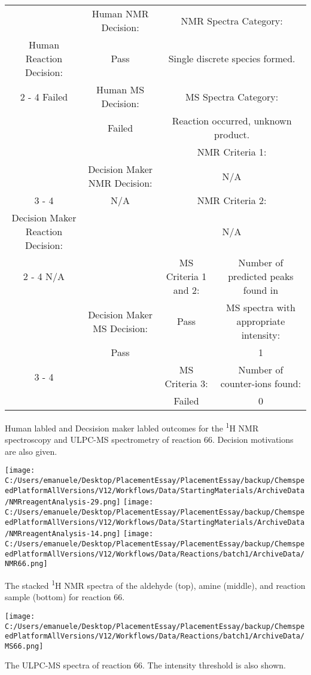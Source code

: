 \documentclass{article}%
\begin{document}
\begin{Decision Table}[H]%
\begin{tabular}{|c|c|c|c|}%
\hline%
&Human NMR Decision:&\multicolumn{2}{|c|}{NMR Spectra Category:}\\%
Human Reaction Decision:&Pass&\multicolumn{2}{|c|}{Single discrete species formed.}\\%
\cline{2%
-%
4}%
Failed&Human MS Decision:&\multicolumn{2}{|c|}{MS Spectra Category:}\\%
&Failed&\multicolumn{2}{|c|}{Reaction occurred, unknown product.}\\%
\hline%
&&\multicolumn{2}{|c|}{NMR Criteria 1:}\\%
&Decision Maker NMR Decision:&\multicolumn{2}{|c|}{N/A}\\%
\cline{3%
-%
4}%
&N/A&\multicolumn{2}{|c|}{NMR Criteria 2:}\\%
Decision Maker Reaction Decision:&&\multicolumn{2}{|c|}{N/A}\\%
\cline{2%
-%
4}%
N/A&&MS Criteria 1 and 2:&Number of predicted peaks found in\\%
&Decision Maker MS Decision:&Pass&MS spectra with appropriate intensity:\\%
&Pass&&1\\%
\cline{3%
-%
4}%
&&MS Criteria 3:&Number of counter{-}ions found:\\%
&&Failed&0\\%
\hline%
\end{tabular}%
\caption{Human labled and Decsision maker labled outcomes for the \textsuperscript{1}H NMR spectroscopy and ULPC-MS spectrometry of reaction 66. Decision motivations are also given.}%
\end{Decision Table}%
\begin{NMR Spectra}[H]%
\begin{center}%
\texttt{[image: C:/Users/emanuele/Desktop/PlacementEssay/PlacementEssay/backup/ChemspeedPlatformAllVersions/V12/Workflows/Data/StartingMaterials/ArchiveData/NMRreagentAnalysis-29.png]}\hfill%
\texttt{[image: C:/Users/emanuele/Desktop/PlacementEssay/PlacementEssay/backup/ChemspeedPlatformAllVersions/V12/Workflows/Data/StartingMaterials/ArchiveData/NMRreagentAnalysis-14.png]}\hfill%
\texttt{[image: C:/Users/emanuele/Desktop/PlacementEssay/PlacementEssay/backup/ChemspeedPlatformAllVersions/V12/Workflows/Data/Reactions/batch1/ArchiveData/NMR66.png]}\hfill%
\end{center}%
\caption{The stacked \textsuperscript{1}H NMR spectra of the aldehyde (top), amine (middle), and reaction sample (bottom) for reaction 66.}%
\end{NMR Spectra}%
\begin{MS Spectra}[H]%
\begin{center}%
\texttt{[image: C:/Users/emanuele/Desktop/PlacementEssay/PlacementEssay/backup/ChemspeedPlatformAllVersions/V12/Workflows/Data/Reactions/batch1/ArchiveData/MS66.png]}\hfill%
\end{center}%
\caption{The ULPC-MS spectra of reaction 66. The intensity threshold is also shown.}%
\end{MS Spectra}%
\end{document}

